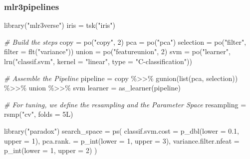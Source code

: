 \documentclass[
]{scrbook}
\newenvironment{Shaded}{\begin{snugshade}}{\end{snugshade}}
\newcommand{\AttributeTok}[1]{\textcolor[rgb]{0.77,0.63,0.00}{#1}}
\newcommand{\CommentTok}[1]{\textcolor[rgb]{0.56,0.35,0.01}{\textit{#1}}}
\newcommand{\DecValTok}[1]{\textcolor[rgb]{0.00,0.00,0.81}{#1}}
\newcommand{\FloatTok}[1]{\textcolor[rgb]{0.00,0.00,0.81}{#1}}
\newcommand{\FunctionTok}[1]{\textcolor[rgb]{0.00,0.00,0.00}{#1}}
\newcommand{\NormalTok}[1]{#1}
\newcommand{\OtherTok}[1]{\textcolor[rgb]{0.56,0.35,0.01}{#1}}
\newcommand{\SpecialCharTok}[1]{\textcolor[rgb]{0.00,0.00,0.00}{#1}}
\newcommand{\StringTok}[1]{\textcolor[rgb]{0.31,0.60,0.02}{#1}}
\renewenvironment{Shaded} {\begin{snugshade}\small} {\end{snugshade}}
\begin{document}
\hypertarget{mlr3pipelines-1}{%
\subsubsection{mlr3pipelines}\label{mlr3pipelines-1}}

\begin{Shaded}
\begin{Highlighting}[]
\FunctionTok{library}\NormalTok{(}\StringTok{"mlr3verse"}\NormalTok{)}
\NormalTok{iris }\OtherTok{=} \FunctionTok{tsk}\NormalTok{(}\StringTok{"iris"}\NormalTok{)}

\CommentTok{\# Build the steps}
\NormalTok{copy }\OtherTok{=} \FunctionTok{po}\NormalTok{(}\StringTok{"copy"}\NormalTok{, }\DecValTok{2}\NormalTok{)}
\NormalTok{pca }\OtherTok{=} \FunctionTok{po}\NormalTok{(}\StringTok{"pca"}\NormalTok{)}
\NormalTok{selection }\OtherTok{=} \FunctionTok{po}\NormalTok{(}\StringTok{"filter"}\NormalTok{, }\AttributeTok{filter =} \FunctionTok{flt}\NormalTok{(}\StringTok{"variance"}\NormalTok{))}
\NormalTok{union }\OtherTok{=} \FunctionTok{po}\NormalTok{(}\StringTok{"featureunion"}\NormalTok{, }\DecValTok{2}\NormalTok{)}
\NormalTok{svm }\OtherTok{=} \FunctionTok{po}\NormalTok{(}\StringTok{"learner"}\NormalTok{, }\FunctionTok{lrn}\NormalTok{(}\StringTok{"classif.svm"}\NormalTok{, }\AttributeTok{kernel =} \StringTok{"linear"}\NormalTok{, }\AttributeTok{type =} \StringTok{"C{-}classification"}\NormalTok{))}

\CommentTok{\# Assemble the Pipeline}
\NormalTok{pipeline }\OtherTok{=}\NormalTok{ copy }\SpecialCharTok{\%\textgreater{}\textgreater{}\%} \FunctionTok{gunion}\NormalTok{(}\FunctionTok{list}\NormalTok{(pca, selection)) }\SpecialCharTok{\%\textgreater{}\textgreater{}\%}\NormalTok{ union }\SpecialCharTok{\%\textgreater{}\textgreater{}\%}\NormalTok{ svm}
\NormalTok{learner }\OtherTok{=} \FunctionTok{as\_learner}\NormalTok{(pipeline)}

\CommentTok{\# For tuning, we define the resampling and the Parameter Space}
\NormalTok{resampling }\OtherTok{=} \FunctionTok{rsmp}\NormalTok{(}\StringTok{"cv"}\NormalTok{, }\AttributeTok{folds =}\NormalTok{ 5L)}

\FunctionTok{library}\NormalTok{(}\StringTok{"paradox"}\NormalTok{)}
\NormalTok{search\_space }\OtherTok{=} \FunctionTok{ps}\NormalTok{(}
  \AttributeTok{classif.svm.cost =} \FunctionTok{p\_dbl}\NormalTok{(}\AttributeTok{lower =} \FloatTok{0.1}\NormalTok{, }\AttributeTok{upper =} \DecValTok{1}\NormalTok{),}
  \AttributeTok{pca.rank. =} \FunctionTok{p\_int}\NormalTok{(}\AttributeTok{lower =} \DecValTok{1}\NormalTok{, }\AttributeTok{upper =} \DecValTok{3}\NormalTok{),}
  \AttributeTok{variance.filter.nfeat =} \FunctionTok{p\_int}\NormalTok{(}\AttributeTok{lower =} \DecValTok{1}\NormalTok{, }\AttributeTok{upper =} \DecValTok{2}\NormalTok{)}
\NormalTok{)}


\end{Highlighting}
\end{Shaded}
\end{document}
